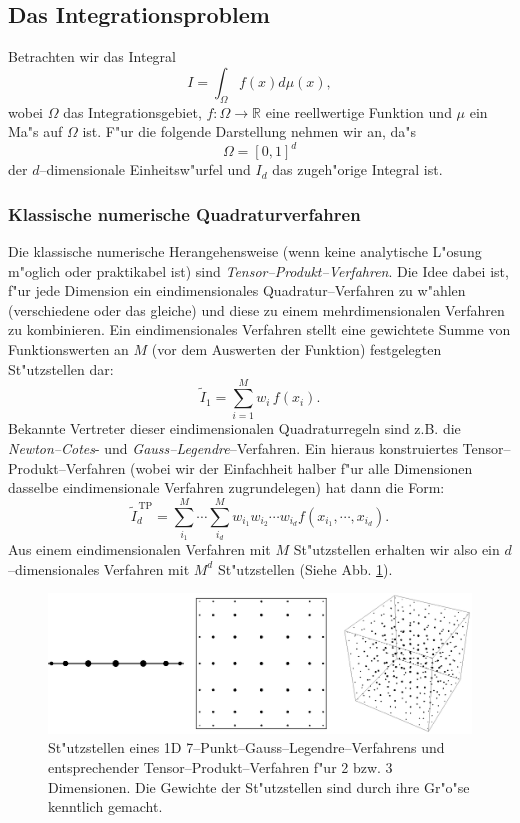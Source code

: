 \documentclass[11pt,a4paper,DIVcalc,BCOR8mm,titlepage,twoside]{scrartcl}
\begin{document}
	\subsection{Das Integrationsproblem}\label{subsec:integrationsproblem}
	Betrachten wir das Integral
	\begin{equation}
		I=\int_\Omega f(x) d\mu(x),
		\label{eq:integration_problem}
	\end{equation}
	wobei $\Omega$ das Integrationsgebiet, $f : \Omega \to \mathbb{R}$ eine reellwertige Funktion und $\mu$ ein Ma"s auf $\Omega$ ist. F"ur die folgende Darstellung nehmen wir an, da"s $$\Omega=[0,1]^d$$ der $d$--dimensionale Einheitsw"urfel und $I_d$ das zugeh"orige Integral ist.
	\subsubsection{Klassische numerische Quadraturverfahren}
	Die klassische numerische Herangehensweise (wenn keine analytische L"osung m"oglich oder praktikabel ist) sind {\em Tensor--Produkt--Verfahren}. Die Idee dabei ist, f"ur jede Dimension ein eindimensionales Quadratur--Verfahren zu w"ahlen (verschiedene oder das gleiche) und diese zu einem mehrdimensionalen Verfahren zu kombinieren. Ein eindimensionales Verfahren stellt eine gewichtete Summe von Funktionswerten an $M$ (vor dem Auswerten der Funktion) festgelegten St"utzstellen dar:
	$${\tilde I}_1=\sum_{i=1}^M w_i\,f(x_i).$$
	Bekannte Vertreter dieser eindimensionalen Quadraturregeln sind z.B. die {\em Newton--Cotes}- und {\em Gauss--Legendre}--Verfahren. Ein hieraus konstruiertes Tensor--Produkt--Verfahren (wobei wir der Einfachheit halber f"ur alle Dimensionen dasselbe eindimensionale Verfahren zugrundelegen) hat dann die Form:
	$${\tilde I}_d^{\,\text{TP}}=\sum_{i_1}^M\cdots\sum_{i_d}^M w_{i_1}w_{i_2}\cdots w_{i_d}f(x_{i_1},\cdots,x_{i_d}).$$
	Aus einem eindimensionalen Verfahren mit $M$ St"utzstellen erhalten wir also ein $d$--dimensionales Verfahren mit $M^d$ St"utzstellen (Siehe Abb. {\ref{fig:tensorproduct}}).
	\begin{figure}
		\centering
		\includegraphics[height=0.25\textheight]{tensorproduct_quadrature.eps}
		\caption{St"utzstellen eines 1D 7--Punkt--Gauss--Legendre--Verfahrens und entsprechender Tensor--Produkt--Verfahren f"ur 2 bzw. 3 Dimensionen. Die Gewichte der St"utzstellen sind durch ihre Gr"o"se kenntlich gemacht.}
		\label{fig:tensorproduct}
	\end{figure}
	
\end{document}
